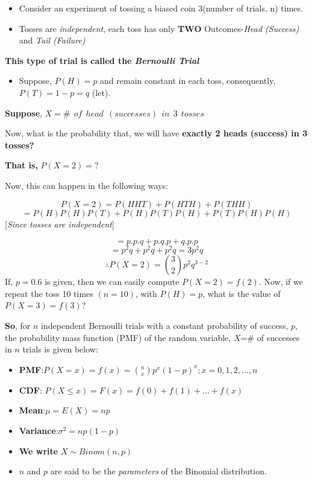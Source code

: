 \documentclass[
]{article}
\providecommand{\tightlist}{%
  \setlength{\itemsep}{0pt}\setlength{\parskip}{0pt}}
\begin{document}
\begin{itemize}
\tightlist
\item
  Consider an experiment of tossing a biased coin 3(number of trials, n) times.
\item
  Tosses are \emph{independent}, each toss has only \textbf{TWO} Outcomes-\emph{Head (Success)} and \emph{Tail (Failure)}
\end{itemize}

\textbf{This type of trial is called the \emph{Bernoulli Trial}}

\begin{itemize}
\tightlist
\item
  Suppose, \(P(H)=p\) and remain constant in each toss, consequently, \(P(T)=1-p=q\) (let).
\end{itemize}

\textbf{Suppose}, \(X=\# \ \ of\ \ head\ \ (successes)\ \  in\ \ 3\ \ tosses\)

Now, what is the probability that, we will have \textbf{exactly 2 heads (success) in 3 tosses?}

\textbf{That is,} \(P(X=2)=?\)

Now, this can happen in the following ways:

\[P(X=2)=P(HHT)+P(HTH)+P(THH)\] \[=P(H)P(H)P(T)+P(H)P(T)P(H)+P(T)P(H)P(H)\] {[}\emph{Since tosses are independent}{]}

\[=p.p.q+p.q.p+q.p.p\] \[=p^2 q+p^2 q+p^2 q=3p^2 q\] \[\therefore P(X=2)=\binom{3}{2}p^2q^{3-2}\] If, \(p=0.6\) is given, then we can easily compute \(P(X=2)=f(2)\). Now, if we repeat the toss 10 times \((n=10)\), with \(P(H)=p\), what is the value of \(P(X=3)=f(3)\)?

\textbf{So}, for \(n\) independent Bernoulli trials with a constant probability of success, \(p\), the probability mass function (PMF) of the random variable, \(X\)=\# of successes in \(n\) trials is given below:

\begin{itemize}
\item
  \textbf{PMF}:\(P(X=x)=f(x)=\binom{n}{x} p^x (1-p)^x ;x=0,1,2,...,n\)
\item
  \textbf{CDF}: \(P(X\le x)=F(x)=f(0)+f(1)+...+f(x)\)
\item
  \textbf{Mean}:\(\mu=E(X)=np\)
\item
  \textbf{Variance}:\(\sigma^2 =np(1-p)\)
\item
  \textbf{We write} \(X\sim Binom(n,p)\)
\item
  \(n\) and \(p\) are said to be the \emph{parameters} of the Binomial distribution.
\end{itemize}
\end{document}
